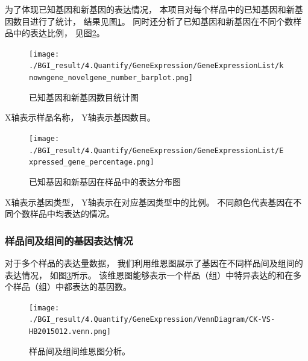 \documentclass[10pt, oneside,a4paper]{article}
\begin{document}
为了体现已知基因和新基因的表达情况， 本项目对每个样品中的已知基因和新基因数目进行了统计，
结果见图\ref{newgene_pic}。 同时还分析了已知基因和新基因在不同个数样品中的表达比例， 见图\ref{newgene_pic2}。\par

\begin{figure}[H]
\centering
\texttt{[image: ./BGI\_result/4.Quantify/GeneExpression/GeneExpressionList/knowngene\_novelgene\_number\_barplot.png]}
\par
\renewcommand{\figurename}{图}
\caption{已知基因和新基因数目统计图}
\label{newgene_pic}
\end{figure}
\begin{center}
X轴表示样品名称， Y轴表示基因数目。
\end{center}


\begin{figure}[H]
\centering
\texttt{[image: ./BGI\_result/4.Quantify/GeneExpression/GeneExpressionList/Expressed\_gene\_percentage.png]}
\par
\renewcommand{\figurename}{图}
\caption{已知基因和新基因在样品中的表达分布图}
\label{newgene_pic2}
\end{figure}
\begin{center}
X轴表示基因类型， Y轴表示在对应基因类型中的比例。 不同颜色代表基因在不同个数样品中均表达的情况。
\end{center}

\subsubsection{样品间及组间的基因表达情况}
对于多个样品的表达量数据， 我们利用维恩图展示了基因在不同样品间及组间的表达情况， 如图\ref{venn}所示。 
该维恩图能够表示一个样品（组）中特异表达的和在多个样品（组）中都表达的基因数。\par

\begin{figure}[H]
\centering
\texttt{[image: ./BGI\_result/4.Quantify/GeneExpression/VennDiagram/CK-VS-HB2015012.venn.png]}
\par
\renewcommand{\figurename}{图}
\caption{样品间及组间维恩图分析。}
\label{venn}
\end{figure}
\end{document}
